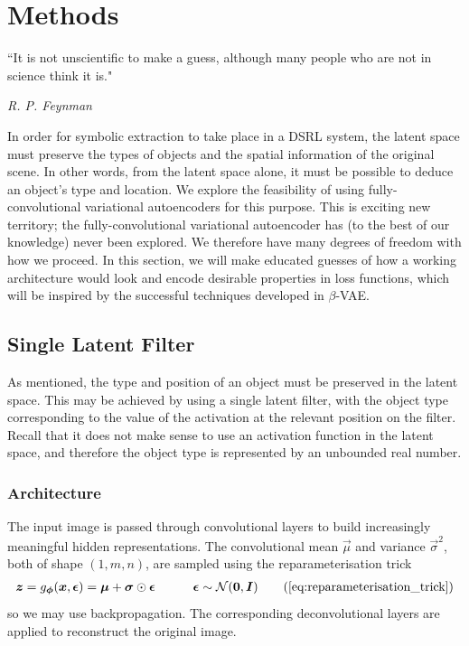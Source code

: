 \chapter{Methods}

\epigraph{``It is not unscientific to make a guess, although many people who are not in science think it is."}{\textit{R. P. Feynman}}

In order for symbolic extraction to take place in a DSRL system, the latent space must preserve the types of objects and the spatial information of the original scene. In other words, from the latent space alone, it must be possible to deduce an object's type and location. We explore the feasibility of using fully-convolutional variational autoencoders for this purpose. This is exciting new territory; the fully-convolutional variational autoencoder has (to the best of our knowledge) never been explored. We therefore have many degrees of freedom with how we proceed. In this section, we will make educated guesses of how a working architecture would look and encode desirable properties in loss functions, which will be inspired by the successful techniques developed in $\beta$-VAE.


\label{ch:methods}


%
%
%
%
%
\section{Single Latent Filter}

As mentioned, the type and position of an object must be preserved in the latent space. This may be achieved by using a single latent filter, with the object type corresponding to the value of the activation at the relevant position on the filter. Recall that it does not make sense to use an activation function in the latent space, and therefore the object type is represented by an unbounded real number.


%
%
\subsection{Architecture}
The input image is passed through convolutional layers to build increasingly meaningful hidden representations. The convolutional mean $\vec{\mu}$ and variance $\vec{\sigma}^2$, both of shape $(1, m, n)$, are sampled using the reparameterisation trick
\begin{align}
\vec{z} = g_{\vec{\phi}}(\vec{x}, \vec{\epsilon}) = \vec{\mu} + \vec{\sigma} \odot \vec{\epsilon} \quad\quad\quad \vec{\epsilon} \sim \mathcal{N}(\vec{0}, \vec{I})
\tag{\ref{eq:reparameterisation_trick}}
\end{align}
so we may use backpropagation. The corresponding deconvolutional layers are applied to reconstruct the original image.\\

